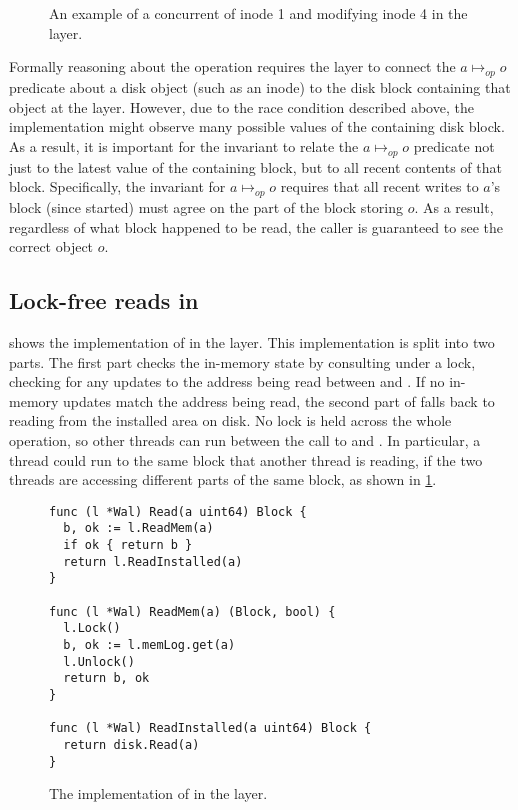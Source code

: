 \begin{figure}[ht]
\centering

\caption{An example of a concurrent  of inode 1 and 
  modifying inode 4
  in the  layer.}
\label{fig:txn-concur}
\end{figure}

Formally reasoning about the  operation requires the 
layer to connect the $a \mapsto_{\mathit{op}} o$ predicate about a disk object
(such as an inode) to the disk block containing that object at the
 layer.  However, due to the race condition described above,
the  implementation might observe many possible values of the
containing disk block.  As a result, it is important for the 
invariant to relate the $a \mapsto_{\mathit{op}} o$ predicate not just to
the latest value of the containing block, but to all recent contents
of that block.  Specifically, the invariant for $a \mapsto_{\mathit{op}} o$
requires that all recent writes to $a$'s block (since 
started) must agree on the part of the block storing $o$.  As a result,
regardless of what block happened to be read,
the caller is guaranteed to see the correct object $o$.

\subsection[Lock-free reads in WAL]{Lock-free reads in }

 shows the implementation of  in the
 layer.  This implementation is split into two parts. The first part checks
the in-memory state by consulting  under a lock, checking for any
updates to the address being read between  and . If
no in-memory updates match the address being read, the second part of  falls back
to reading from the installed area on disk.  No lock is held across the whole
operation, so other threads
can run between the call to  and .
In particular, a thread could run 
to the same block that another thread is reading, if the two threads
are accessing different parts of the same block, as shown in \cref{fig:txn-concur}.

\begin{figure}[ht]
\begin{verbatim}
func (l *Wal) Read(a uint64) Block {
  b, ok := l.ReadMem(a)
  if ok { return b }
  return l.ReadInstalled(a)
}

func (l *Wal) ReadMem(a) (Block, bool) {
  l.Lock()
  b, ok := l.memLog.get(a)
  l.Unlock()
  return b, ok
}

func (l *Wal) ReadInstalled(a uint64) Block {
  return disk.Read(a)
}
\end{verbatim}
\caption{The implementation of  in the  layer.}
\label{fig:walread}
\end{figure}


